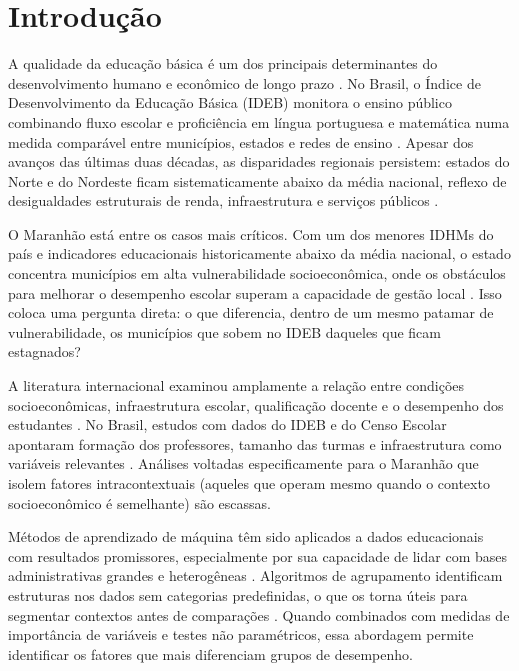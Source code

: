 \chapter{Introdução} \label{cap:intro}

A qualidade da educação básica é um dos principais determinantes do desenvolvimento humano e econômico de longo prazo \cite{hanushek2012}. No Brasil, o Índice de Desenvolvimento da Educação Básica (IDEB) monitora o ensino público combinando fluxo escolar e proficiência em língua portuguesa e matemática numa medida comparável entre municípios, estados e redes de ensino \cite{fernandes2007}. Apesar dos avanços das últimas duas décadas, as disparidades regionais persistem: estados do Norte e do Nordeste ficam sistematicamente abaixo da média nacional, reflexo de desigualdades estruturais de renda, infraestrutura e serviços públicos \cite{inep2023}.

O Maranhão está entre os casos mais críticos. Com um dos menores IDHMs do país e indicadores educacionais historicamente abaixo da média nacional, o estado concentra municípios em alta vulnerabilidade socioeconômica, onde os obstáculos para melhorar o desempenho escolar superam a capacidade de gestão local \cite{ibge2010, inep2023}. Isso coloca uma pergunta direta: o que diferencia, dentro de um mesmo patamar de vulnerabilidade, os municípios que sobem no IDEB daqueles que ficam estagnados?

A literatura internacional examinou amplamente a relação entre condições socioeconômicas, infraestrutura escolar, qualificação docente e o desempenho dos estudantes \cite{rivkin2005, coleman1966}. No Brasil, estudos com dados do IDEB e do Censo Escolar apontaram formação dos professores, tamanho das turmas e infraestrutura como variáveis relevantes \cite{vasconcelos2021, soares2013}. Análises voltadas especificamente para o Maranhão que isolem fatores intracontextuais (aqueles que operam mesmo quando o contexto socioeconômico é semelhante) são escassas.

Métodos de aprendizado de máquina têm sido aplicados a dados educacionais com resultados promissores, especialmente por sua capacidade de lidar com bases administrativas grandes e heterogêneas \cite{baker2010, romero2020}. Algoritmos de agrupamento identificam estruturas nos dados sem categorias predefinidas, o que os torna úteis para segmentar contextos antes de comparações \cite{faceli2021}. Quando combinados com medidas de importância de variáveis e testes não paramétricos, essa abordagem permite identificar os fatores que mais diferenciam grupos de desempenho.

